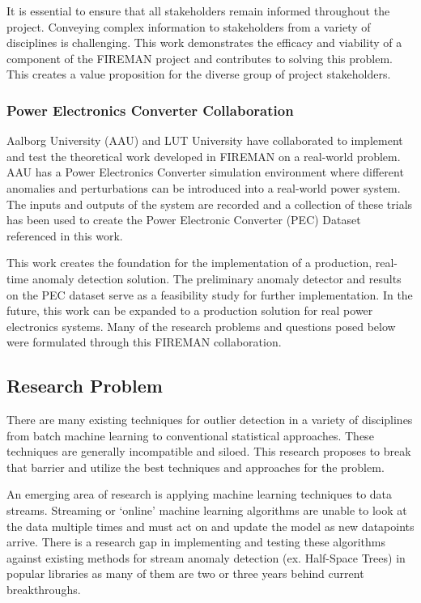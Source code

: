 It is essential to ensure that all stakeholders remain informed throughout the project. Conveying complex information to stakeholders from a variety of disciplines is challenging. This work demonstrates the efficacy and viability of a component of the FIREMAN project and contributes to solving this problem. This creates a value proposition for the diverse group of project stakeholders.

\subsubsection{Power Electronics Converter Collaboration}

Aalborg University (AAU) and LUT University have collaborated to implement and test the theoretical work developed in FIREMAN on a real-world problem. AAU has a Power Electronics Converter simulation environment where different anomalies and perturbations can be introduced into a real-world power system. The inputs and outputs of the system are recorded and a collection of these trials has been used to create the Power Electronic Converter (PEC) Dataset referenced in this work.

This work creates the foundation for the implementation of a production, real-time anomaly detection solution. The preliminary anomaly detector and results on the PEC dataset serve as a feasibility study for further implementation. In the future, this work can be expanded to a production solution for real power electronics systems. Many of the research problems and questions posed below were formulated through this FIREMAN collaboration.

\subsection{Research Problem}
\label{ref_research_problem}

There are many existing techniques for outlier detection in a variety of disciplines from batch machine learning to conventional statistical approaches. These techniques are generally incompatible and siloed. This research proposes to break that barrier and utilize the best techniques and approaches for the problem.

An emerging area of research is applying machine learning techniques to data streams.
Streaming or `online' machine learning algorithms are unable to look at the data multiple times and must act on and update the model as new datapoints arrive.
There is a research gap in implementing and testing these algorithms against existing methods for stream anomaly detection (ex. Half-Space Trees) in popular libraries as many of them are two or three years behind current breakthroughs.

